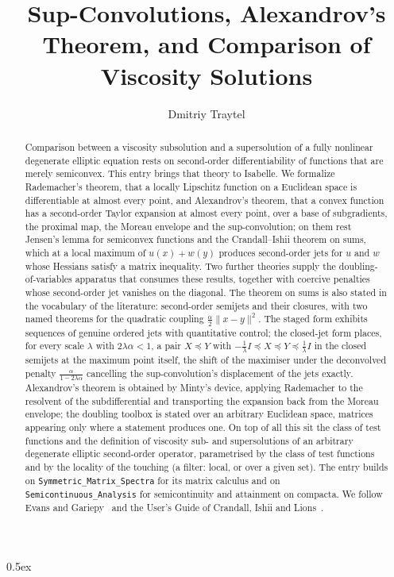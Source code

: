 \documentclass[11pt,a4paper]{article}
\begin{document}
\title{Sup-Convolutions, Alexandrov's Theorem, and Comparison of Viscosity Solutions}
\author{Dmitriy Traytel}
\maketitle

\begin{abstract}
  Comparison between a viscosity subsolution and a supersolution of a fully
  nonlinear degenerate elliptic equation rests on second-order
  differentiability of functions that are merely semiconvex.  This entry
  brings that theory to Isabelle.  We formalize Rademacher's theorem, that a
  locally Lipschitz function on a Euclidean space is differentiable at almost
  every point, and Alexandrov's theorem, that a convex function has a
  second-order Taylor expansion at almost every point, over a base of
  subgradients, the proximal map, the Moreau envelope and the
  sup-convolution; on them rest Jensen's lemma for semiconvex functions and
  the Crandall--Ishii theorem on sums, which at a local maximum of
  $u(x)+w(y)$ produces second-order jets for $u$ and $w$ whose Hessians
  satisfy a matrix inequality.  Two further theories supply the
  doubling-of-variables apparatus that consumes these results, together with
  coercive penalties whose second-order jet vanishes on the diagonal.  The
  theorem on sums is also stated in the vocabulary of the literature:
  second-order semijets and their closures, with two named theorems for the
  quadratic coupling $\frac{\alpha}{2}\lVert x-y\rVert^2$.  The staged form
  exhibits sequences of genuine ordered jets with quantitative control; the
  closed-jet form places, for every scale $\lambda$ with $2\lambda\alpha<1$,
  a pair $X \preceq Y$ with
  $-\frac{1}{\lambda}I \preceq X \preceq Y \preceq \frac{1}{\lambda}I$ in
  the closed semijets at the maximum point itself, the shift of the
  maximiser under the deconvolved penalty
  $\frac{\alpha}{1-2\lambda\alpha}$ cancelling the sup-convolution's
  displacement of the jets exactly.
  Alexandrov's theorem is obtained by Minty's device, applying Rademacher to
  the resolvent of the subdifferential and transporting the expansion back
  from the Moreau envelope; the doubling toolbox is stated over an arbitrary
  Euclidean space, matrices appearing only where a statement produces one.
  On top of all this sit the class of test functions and the definition of
  viscosity sub- and supersolutions of an arbitrary degenerate elliptic
  second-order operator, parametrised by the class of test functions and by
  the locality of the touching (a filter: local, or over a given set).  The entry builds on
  \texttt{Symmetric\_Matrix\_Spectra} for its matrix calculus and on
  \texttt{Semicontinuous\_Analysis} for semicontinuity and attainment on
  compacta.
  We follow Evans and Gariepy~\cite{EvansGariepy} and the User's Guide of
  Crandall, Ishii and Lions~\cite{CrandallIshiiLions}.
\end{abstract}

\tableofcontents

\parindent 0pt\parskip 0.5ex





\end{document}
